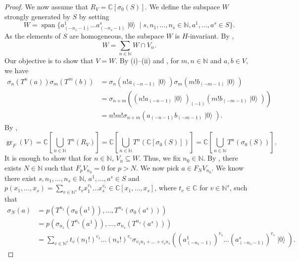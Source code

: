 \documentclass[a4paper, 12pt, reqno]{amsart}
\theoremstyle{remark}
\DeclareMathOperator{\gr}{gr}
\DeclareMathOperator{\vspan}{span}
\DeclareMathOperator{\vac}{|0\rangle}
\begin{document}
\begin{proof}
  We now assume that $R_V = \mathbb{C}[\sigma_0(S)]$.
  We define the subspace $W$ strongly generated by $S$ by setting
  \begin{equation*}
    W = \vspan\{a^1_{(-n_1 - 1)}\dots a^s_{(-n_s - 1)}\vac \mid s, n_1, \dots, n_s \in \mathbb{N}, a^1, \dots, a^s \in S\}.
  \end{equation*}
  As the elements of $S$ are homogeneous, the subspace $W$ is $H$-invariant.
  By ,
  \begin{equation}
    \label{eq:46}
    W = \sum_{n \in \mathbb{N}}W \cap V_n.
  \end{equation}
  Our objective is to show that $V = W$.
  By (i)--(ii) and , for $m, n \in \mathbb{N}$ and $a, b \in V$, we have
  \begin{align*}
    \sigma_n(T^n(a))\sigma_m(T^m(b)) &= \sigma_n(n!a_{(-n - 1)}\vac)\sigma_m(m!b_{(-m - 1)}\vac) \\
                                     &= \sigma_{n + m}((n!a_{(-n - 1)}\vac)_{(-1)}(m!b_{(-m - 1)}\vac)) \\
                                     &= n!m!\sigma_{n + m}(a_{(-n - 1)}b_{(-m - 1)}\vac).
  \end{align*}
  By ,
  \begin{equation*}
    \gr_F(V) = \mathbb{C}\left[\bigcup_{n \in \mathbb{N}}T^n(R_V)\right] = \mathbb{C}\left[\bigcup_{n \in \mathbb{N}}T^n(\mathbb{C}[\sigma_0(S)])\right] = \mathbb{C}\left[\bigcup_{n \in \mathbb{N}}T^n(\sigma_0(S))\right].
  \end{equation*}
  It is enough to show that for $n \in \mathbb{N}$, $V_n \subseteq W$.
  Thus, we fix $n_0 \in \mathbb{N}$.
  By , there exists $N \in \mathbb{N}$ such that $F_pV_{n_0} = 0$ for $p > N$.
  We now pick $a \in F_NV_{n_0}$.
  We know there exist $s, n_1, \dots, n_s \in \mathbb{N}$, $a^1, \dots, a^s \in S$ and $p(x_1, \dots, x_s) = \sum_{v \in \mathbb{N}^s}t_vx_1^{v_1}\dots x_s^{v_s} \in \mathbb{C}[x_1, \dots, x_s]$, where $t_v \in \mathbb{C}$ for $v \in \mathbb{N}^s$, such that
  \begin{align*}
    \sigma_N(a) &= p(T^{n_1}(\sigma_0(a^1)), \dots, T^{n_s}(\sigma_0(a^s))) \\
                &= p(\sigma_{n_1}(T^{n_1}(a^1)), \dots, \sigma_{n_s}(T^{n_s}(a^s))) \\
                &= \sum_{v \in \mathbb{N}^s}t_v(n_1!)^{v_1}\dots(n_s!)^{v_s}\sigma_{v_1n_1 + \dots + v_sn_s}((a^1_{(-n_1 - 1)})^{v_1}\dots(a^s_{(-n_s - 1)})^{v_s}\vac).
  \end{align*}

\end{proof}
\end{document}
